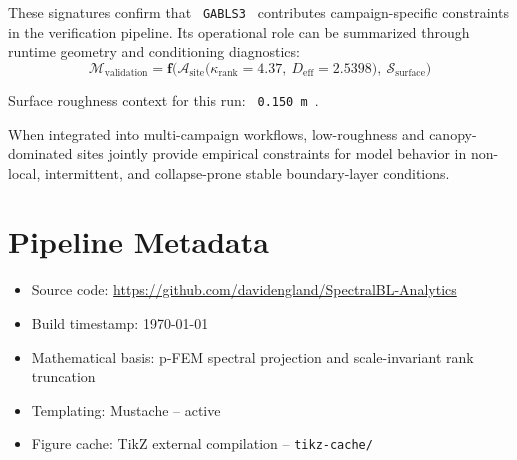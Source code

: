 \documentclass[11pt,a4paper]{article}
\begin{document}
These signatures confirm that \texttt{ GABLS3 } contributes campaign-specific constraints in the verification pipeline. Its operational role can be summarized through runtime geometry and conditioning diagnostics:
\begin{equation}
    \mathcal{M}_{\text{validation}} = \mathbf{f}\Big(\mathcal{A}_{\text{site}}\big(\kappa_{\text{rank}}=4.37,\ D_{\text{eff}}=2.5398\big),\ \mathcal{S}_{\text{surface}}\Big)
\end{equation}

Surface roughness context for this run: \texttt{ 0.150 m }.

When integrated into multi-campaign workflows, low-roughness and canopy-dominated sites jointly provide empirical constraints for model behavior in non-local, intermittent, and collapse-prone stable boundary-layer conditions.

\label{sec:conclusions_GABLS3}
 
\newpage

\appendix

\section{Pipeline Metadata}

\begin{itemize}
    \item Source code: \url{https://github.com/davidengland/SpectralBL-Analytics}
    \item Build timestamp: \today{}
    \item Mathematical basis: p-FEM spectral projection and scale-invariant rank truncation
    \item Templating: Mustache -- active
    \item Figure cache: TikZ external compilation -- \texttt{tikz-cache/}
\end{itemize}
\end{document}
